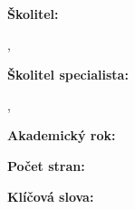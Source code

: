 {  \vspace{0.5cm}
  \noindent
  \begin{minipage}[t]{0.25\textwidth}\vspace{0pt}%
    \doccol \textbf{Školitel:}
  \end{minipage}
  \hspace{0.05\textwidth}
  \begin{minipage}[t]{0.7\textwidth}\vspace{0pt}%
    \@Supervisor, \par
    \@SupervisorAffCZE
  \end{minipage} \par
  \vspace{0.5cm}
  \noindent
  \begin{minipage}[t]{0.25\textwidth}\vspace{0pt}%
    \doccol \textbf{Školitel specialista:}
  \end{minipage}
  \hspace{0.05\textwidth}
  \begin{minipage}[t]{0.7\textwidth}\vspace{0pt}%
    \@SupervisorSpec, \par
    \@SupervisorSpecAffCZE 
  \end{minipage} \par
  \vspace{0.5cm}
  \noindent
  \begin{minipage}[t]{0.25\textwidth}\vspace{0pt}%
    \doccol \textbf{Akademický rok:}
  \end{minipage}
  \hspace{0.05\textwidth}
  \begin{minipage}[t]{0.7\textwidth}\vspace{0pt}%
    \@AcademicYear
  \end{minipage} \par
  \vspace{0.5cm}
  \noindent
  \begin{minipage}[t]{0.25\textwidth}\vspace{0pt}%
    \doccol \textbf{Počet stran:}
  \end{minipage}
  \hspace{0.05\textwidth}
  \begin{minipage}[t]{0.7\textwidth}\vspace{0pt}%
    \@NumberOfPages
  \end{minipage} \par
  \vspace{0.5cm}
  \noindent
  \begin{minipage}[t]{0.25\textwidth}\vspace{0pt}%
    \doccol \textbf{Klíčová slova:}
  \end{minipage}
  \hspace{0.05\textwidth}
  \begin{minipage}[t]{0.7\textwidth}\vspace{0pt}%
    \@KeywordsCZE
  \end{minipage} \par
  \vfill
  \clearpage

}
